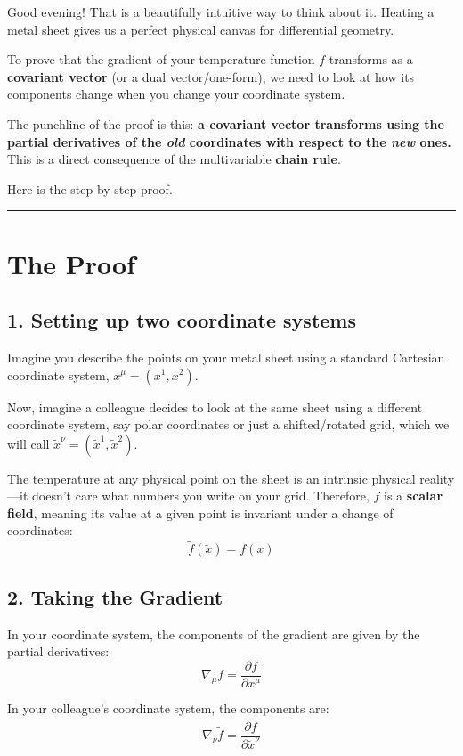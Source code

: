\documentclass[11pt,a4paper]{article}
\begin{document}
	
	Good evening! That is a beautifully intuitive way to think about it. Heating a metal sheet gives us a perfect physical canvas for differential geometry. 
	
	To prove that the gradient of your temperature function $f$ transforms as a \textbf{covariant vector} (or a dual vector/one-form), we need to look at how its components change when you change your coordinate system. 
	
	The punchline of the proof is this: \textbf{a covariant vector transforms using the partial derivatives of the \textit{old} coordinates with respect to the \textit{new} ones.} This is a direct consequence of the multivariable \textbf{chain rule}.
	
	Here is the step-by-step proof.
	
	\medskip
	\hrule
	\medskip
	
	\section*{The Proof}
	
	\subsection*{1. Setting up two coordinate systems}
	Imagine you describe the points on your metal sheet using a standard Cartesian coordinate system, $x^\mu = (x^1, x^2)$. 
	
	Now, imagine a colleague decides to look at the same sheet using a different coordinate system, say polar coordinates or just a shifted/rotated grid, which we will call $\tilde{x}^\nu = (\tilde{x}^1, \tilde{x}^2)$. 
	
	The temperature at any physical point on the sheet is an intrinsic physical reality---it doesn't care what numbers you write on your grid. Therefore, $f$ is a \textbf{scalar field}, meaning its value at a given point is invariant under a change of coordinates:
	\[
	\tilde{f}(\tilde{x}) = f(x)
	\]
	
	\subsection*{2. Taking the Gradient}
	In your coordinate system, the components of the gradient are given by the partial derivatives:
	\[
	\nabla_\mu f = \frac{\partial f}{\partial x^\mu}
	\]
	
	In your colleague's coordinate system, the components are:
	\[
	\nabla_\nu \tilde{f} = \frac{\partial \tilde{f}}{\partial \tilde{x}^\nu}
	\]
	
\end{document}
